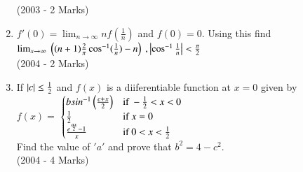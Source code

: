\documentclass[journal,12pt,twocolumn]{IEEEtran}
\theoremstyle{remark}
\begin{document}
\begin{enumerate}
\hfill (2003 - 2 Marks)
\item $f'(0) = \lim_{n \to \infty} nf(\frac{1}{n})$ and $f(0) = 0$. Using this find\\
	$\lim_{x \to \infty}\ \brak{(n+1)\frac{2}{\pi}\cos^{-1}(\frac{1}{n})-n}\ , \abs{\cos^{-1}\frac{1}{n}}<\frac{\pi}{2}$\\  
\hfill (2004 - 2 Marks)
\item If $\left\vert c\right\vert \leq \frac{1}{2}$ and $f(x)$ is a diiferentiable function at $x = 0$ given by\\
$f(x) = $
$\begin{cases}
	bsin^{-1} \brak{\frac{c + x}{2}} & \text{if}\ -\frac{1}{2}<x<0\\
    \frac{1}{2} & \text{if}\ x=0\\
    \frac{e^\frac{ax}{2} - 1}{x} & \text{if}\ 0<x<\frac{1}{2}
\end{cases}$\\
Find the value of $'a'$ and prove that $b^2 = 4 - c^2$.\\
\hfill (2004 - 4 Marks)






      
\end{enumerate}
\end{document}
